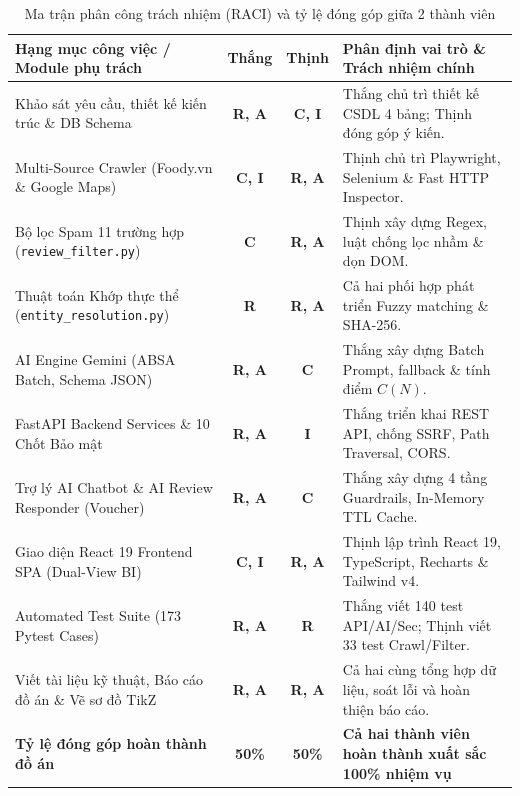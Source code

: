 \documentclass[12pt, a4paper, oneside]{book}
\begin{document}
\begin{table}[H]
\centering
\caption{Ma trận phân công trách nhiệm (RACI) và tỷ lệ đóng góp giữa 2 thành viên}
\label{tab:raci_matrix}
\vspace{0.15cm}
\footnotesize
\begin{tabularx}{\textwidth}{l c c X}
\toprule
\rowcolor{blue!8}
\textbf{Hạng mục công việc / Module phụ trách} & \textbf{Thắng} & \textbf{Thịnh} & \textbf{Phân định vai trò \& Trách nhiệm chính} \\
\midrule
Khảo sát yêu cầu, thiết kế kiến trúc \& DB Schema & \textbf{R, A} & \textbf{C, I} & Thắng chủ trì thiết kế CSDL 4 bảng; Thịnh đóng góp ý kiến. \\
Multi-Source Crawler (Foody.vn \& Google Maps) & \textbf{C, I} & \textbf{R, A} & Thịnh chủ trì Playwright, Selenium \& Fast HTTP Inspector. \\
Bộ lọc Spam 11 trường hợp (\texttt{review\_filter.py}) & \textbf{C} & \textbf{R, A} & Thịnh xây dựng Regex, luật chống lọc nhầm \& dọn DOM. \\
Thuật toán Khớp thực thể (\texttt{entity\_resolution.py}) & \textbf{R} & \textbf{R, A} & Cả hai phối hợp phát triển Fuzzy matching \& SHA-256. \\
AI Engine Gemini (ABSA Batch, Schema JSON) & \textbf{R, A} & \textbf{C} & Thắng xây dựng Batch Prompt, fallback \& tính điểm $C(N)$. \\
FastAPI Backend Services \& 10 Chốt Bảo mật & \textbf{R, A} & \textbf{I} & Thắng triển khai REST API, chống SSRF, Path Traversal, CORS. \\
Trợ lý AI Chatbot \& AI Review Responder (Voucher) & \textbf{R, A} & \textbf{C} & Thắng xây dựng 4 tầng Guardrails, In-Memory TTL Cache. \\
Giao diện React 19 Frontend SPA (Dual-View BI) & \textbf{C, I} & \textbf{R, A} & Thịnh lập trình React 19, TypeScript, Recharts \& Tailwind v4. \\
Automated Test Suite (173 Pytest Cases) & \textbf{R, A} & \textbf{R} & Thắng viết 140 test API/AI/Sec; Thịnh viết 33 test Crawl/Filter. \\
Viết tài liệu kỹ thuật, Báo cáo đồ án \& Vẽ sơ đồ TikZ & \textbf{R, A} & \textbf{R, A} & Cả hai cùng tổng hợp dữ liệu, soát lỗi và hoàn thiện báo cáo. \\
\midrule
\rowcolor{blue!8}
\textbf{Tỷ lệ đóng góp hoàn thành đồ án} & \textbf{50\%} & \textbf{50\%} & \textbf{Cả hai thành viên hoàn thành xuất sắc 100\% nhiệm vụ} \\
\bottomrule
\end{tabularx}
\end{table}
\end{document}
